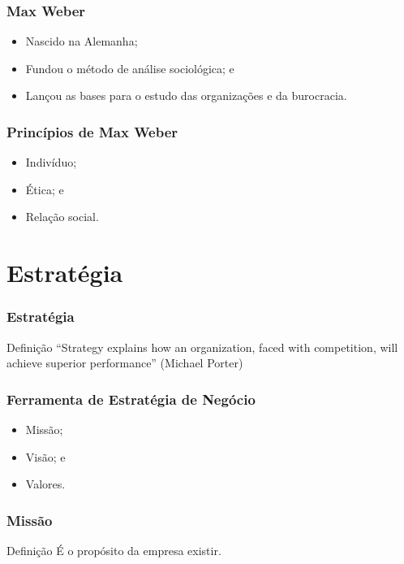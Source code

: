 \documentclass[aspectratio=169]{beamer}
\begin{document}
\begin{frame}
	\frametitle{Max Weber}

	\begin{itemize}
		\item Nascido na Alemanha;
		\item Fundou o método de análise sociológica; e
		\item Lan\c cou as bases para o estudo das organiza\c cões e da burocracia.
	\end{itemize}
\end{frame}

\begin{frame}
	\frametitle{Princípios de Max Weber}

	\begin{itemize}
		\item Indivíduo;
		\item Ética; e
		\item Rela\c cão social.
	\end{itemize}
\end{frame}

\section{Estratégia}

\begin{frame}
	\frametitle{Estratégia}

	\begin{block}{Defini\c cão}
		``Strategy explains how an organization, faced with competition, will achieve superior performance'' (Michael Porter)
	\end{block}
\end{frame}

\begin{frame}
	\frametitle{Ferramenta de Estratégia de Negócio}

	\begin{itemize}
		\item Missão;
		\item Visão; e
		\item Valores.
	\end{itemize}
\end{frame}

\begin{frame}
	\frametitle{Missão}

	\begin{block}{Defini\c cão}
		É o propósito da empresa existir.
	\end{block}
\end{frame}
\end{document}
